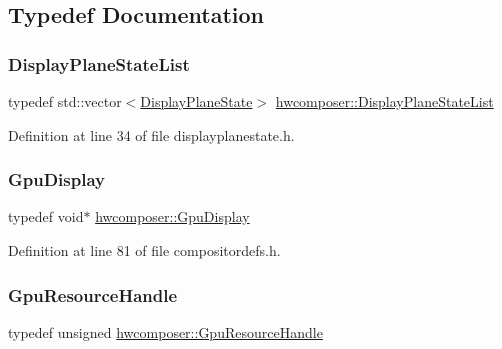 \subsection{Typedef Documentation}
\mbox{\label{namespacehwcomposer_adf383ae435d39a5631a8ad82e7fa18a4}} 
\subsubsection{\texorpdfstring{Display\+Plane\+State\+List}{DisplayPlaneStateList}}
{\footnotesize\ttfamily typedef std\+::vector$<$\mbox{\hyperlink{classhwcomposer_1_1DisplayPlaneState}{Display\+Plane\+State}}$>$ \mbox{\hyperlink{namespacehwcomposer_adf383ae435d39a5631a8ad82e7fa18a4}{hwcomposer\+::\+Display\+Plane\+State\+List}}}



Definition at line 34 of file displayplanestate.\+h.

\mbox{\label{namespacehwcomposer_ace90739a34de8ec5b30559423cdef990}} 
\subsubsection{\texorpdfstring{Gpu\+Display}{GpuDisplay}}
{\footnotesize\ttfamily typedef void$\ast$ \mbox{\hyperlink{namespacehwcomposer_ace90739a34de8ec5b30559423cdef990}{hwcomposer\+::\+Gpu\+Display}}}



Definition at line 81 of file compositordefs.\+h.

\mbox{\label{namespacehwcomposer_a3da411c7c0213da2ce847c654bdc180d}} 
\subsubsection{\texorpdfstring{Gpu\+Resource\+Handle}{GpuResourceHandle}}
{\footnotesize\ttfamily typedef unsigned \mbox{\hyperlink{namespacehwcomposer_a3da411c7c0213da2ce847c654bdc180d}{hwcomposer\+::\+Gpu\+Resource\+Handle}}}



